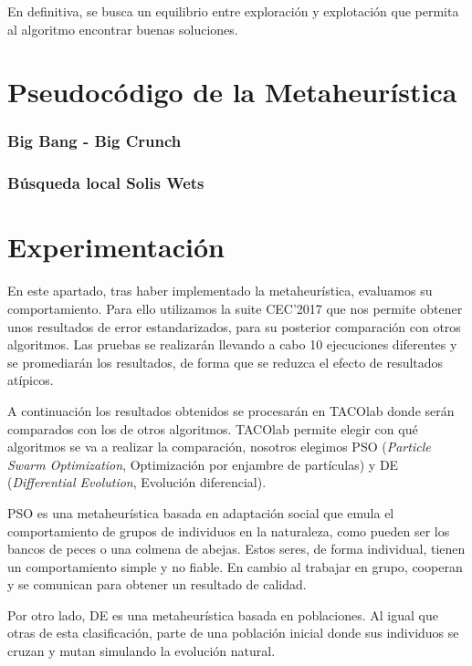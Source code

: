 En definitiva, se busca un equilibrio entre exploración y explotación que permita al algoritmo encontrar buenas soluciones.

\part{Pseudocódigo de la Metaheurística}

\section{Big Bang - Big Crunch}

\section{Búsqueda local Solis Wets}





\part{Experimentación}
En este apartado, tras haber implementado la metaheurística, evaluamos su comportamiento. Para ello utilizamos la suite CEC'2017 que nos permite obtener unos resultados de error estandarizados, para su posterior comparación con otros algoritmos. Las pruebas se realizarán llevando a cabo 10 ejecuciones diferentes y se promediarán los resultados, de forma que se reduzca el efecto de resultados atípicos. 

A continuación los resultados obtenidos se procesarán en TACOlab \cite{tacolab} donde serán comparados con los de otros algoritmos. TACOlab permite elegir con qué algoritmos se va a realizar la comparación, nosotros elegimos PSO (\textit{Particle Swarm Optimization}, Optimización por enjambre de partículas) y DE (\textit{Differential Evolution}, Evolución diferencial).

PSO es una metaheurística basada en adaptación social que emula el comportamiento de grupos de individuos en la naturaleza, como pueden ser los bancos de peces o una colmena de abejas. Estos seres, de forma individual, tienen un comportamiento simple y no fiable. En cambio al trabajar en grupo, cooperan y se comunican para obtener un resultado de calidad. 

Por otro lado, DE es una metaheurística basada en poblaciones. Al igual que otras de esta clasificación, parte de una población inicial donde sus individuos se cruzan y mutan simulando la evolución natural.


